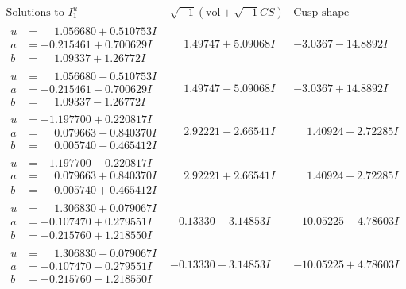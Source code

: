 \documentclass[1p]{elsarticle_modified}
\theoremstyle{definition}
\newcommand{\I}{\sqrt{-1}}
\begin{document}
$$\begin{array}{c|c|c}  
\text{Solutions to }I^u_{1}& \I (\text{vol} + \sqrt{-1}CS) & \text{Cusp shape}\\
 \hline 
\begin{aligned}
u &= \phantom{-}1.056680 + 0.510753 I \\
a &= -0.215461 + 0.700629 I \\
b &= \phantom{-}1.09337 + 1.26772 I\end{aligned}
 & \phantom{-}1.49747 + 5.09068 I & -3.0367 - 14.8892 I \\ \hline\begin{aligned}
u &= \phantom{-}1.056680 - 0.510753 I \\
a &= -0.215461 - 0.700629 I \\
b &= \phantom{-}1.09337 - 1.26772 I\end{aligned}
 & \phantom{-}1.49747 - 5.09068 I & -3.0367 + 14.8892 I \\ \hline\begin{aligned}
u &= -1.197700 + 0.220817 I \\
a &= \phantom{-}0.079663 - 0.840370 I \\
b &= \phantom{-}0.005740 - 0.465412 I\end{aligned}
 & \phantom{-}2.92221 - 2.66541 I & \phantom{-}1.40924 + 2.72285 I \\ \hline\begin{aligned}
u &= -1.197700 - 0.220817 I \\
a &= \phantom{-}0.079663 + 0.840370 I \\
b &= \phantom{-}0.005740 + 0.465412 I\end{aligned}
 & \phantom{-}2.92221 + 2.66541 I & \phantom{-}1.40924 - 2.72285 I \\ \hline\begin{aligned}
u &= \phantom{-}1.306830 + 0.079067 I \\
a &= -0.107470 + 0.279551 I \\
b &= -0.215760 + 1.218550 I\end{aligned}
 & -0.13330 + 3.14853 I & -10.05225 - 4.78603 I \\ \hline\begin{aligned}
u &= \phantom{-}1.306830 - 0.079067 I \\
a &= -0.107470 - 0.279551 I \\
b &= -0.215760 - 1.218550 I\end{aligned}
 & -0.13330 - 3.14853 I & -10.05225 + 4.78603 I \\ \hline\begin{aligned}

\end{aligned}
\end{array}$$
\end{document}

